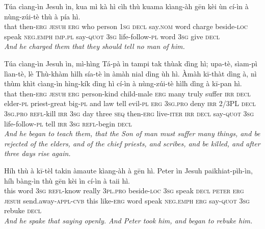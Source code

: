 \documentclass[11pt,a4paper]{article}
\begin{document}
\begin{exe}
\gll Túa cìang-ìn Jesuh ìn, kua mì kà hì cìh thù kuama kìang-àh gēn kèi ùn cí-ìn à nùng-zúi-tè thù à pía hì. \\
     that then-\textsc{erg} \textsc{jesuh} \textsc{erg} who person \textsc{1sg} \textsc{decl} say.\textsc{nom} word charge beside-\textsc{loc} speak \textsc{neg}.\textsc{emph} \textsc{imp}.\textsc{pl} say-\textsc{quot} \textsc{3sg} life-follow-\textsc{pl} word \textsc{3sg} give \textsc{decl} \\
\glt \textcolor{kjvcolor}{\textit{And he charged them that they should tell no man of him.}}

\gll Túa cìang-ìn Jesuh ìn, mì-hìng Tá-pà ìn tampi tak thùak dìng hì; upa-tè, sìam-pì lìan-tè, lè Thù-khàm hìlh sía-tè ìn àmàh nial dìng ùh hì. Àmàh kī-thàt dìng à, nì thùm khìt cìang-ìn hìng-kík dìng hì cí-ìn à nùng-zúi-tè hìlh dìng à kī-pan hì. \\
     that then-\textsc{erg} \textsc{jesuh} \textsc{erg} person-kind child-male \textsc{erg} many truly suffer \textsc{irr} \textsc{decl} elder-\textsc{pl} priest-great big-\textsc{pl} and law tell evil-\textsc{pl} \textsc{erg} \textsc{3sg}.\textsc{pro} deny \textsc{irr} 2/3PL \textsc{decl} \textsc{3sg}.\textsc{pro} \textsc{refl}-kill \textsc{irr} \textsc{3sg} day three \textsc{seq} then-\textsc{erg} live-\textsc{iter} \textsc{irr} \textsc{decl} say-\textsc{quot} \textsc{3sg} life-follow-\textsc{pl} tell \textsc{irr} \textsc{3sg} \textsc{refl}-begin \textsc{decl} \\
\glt \textcolor{kjvcolor}{\textit{And he began to teach them, that the Son of man must suffer many things, and be rejected of the elders, and of the chief priests, and scribes, and be killed, and after three days rise again.}}

\gll Híh thù à kī-tèl takin àmaute kìang-àh à gēn hì. Peter ìn Jesuh paikhiat-pìh-ìn, híh bàng-ìn thù gēn kèi ìn cí-ìn à taii hì. \\
     this word \textsc{3sg} \textsc{refl}-know really \textsc{3pl}.\textsc{pro} beside-\textsc{loc} \textsc{3sg} speak \textsc{decl} \textsc{peter} \textsc{erg} \textsc{jesuh} send.away-\textsc{appl}-\textsc{cvb} this like-\textsc{erg} word speak \textsc{neg}.\textsc{emph} \textsc{erg} say-\textsc{quot} \textsc{3sg} rebuke \textsc{decl} \\
\glt \textcolor{kjvcolor}{\textit{And he spake that saying openly. And Peter took him, and began to rebuke him.}}


\end{exe}
\end{document}
